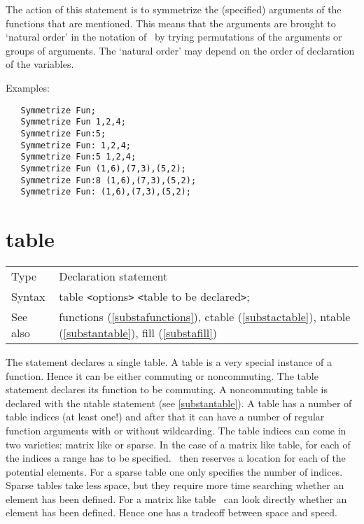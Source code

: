 \noindent The action of this statement is to symmetrize the 
(specified) arguments of the functions that are mentioned. This means that 
the arguments are brought to `natural order' in the notation of \FORM\ by 
trying permutations of the arguments or groups of 
arguments. The `natural order' may depend on the order of declaration of 
the variables. \vspace{4mm}

\noindent Examples:
\begin{verbatim}
   Symmetrize Fun;
   Symmetrize Fun 1,2,4;
   Symmetrize Fun:5;
   Symmetrize Fun: 1,2,4;
   Symmetrize Fun:5 1,2,4;
   Symmetrize Fun (1,6),(7,3),(5,2);
   Symmetrize Fun:8 (1,6),(7,3),(5,2);
   Symmetrize Fun: (1,6),(7,3),(5,2);
\end{verbatim}
 \vspace{10mm}


\section{table}
\label{substatable}

\noindent \begin{tabular}{ll}
Type & Declaration statement\\
Syntax & table {\tt<}options{\tt>} {\tt<}table to be 
declared{\tt>}; \\
See also & functions (\ref{substafunctions}), ctable (\ref{substactable}),
        ntable (\ref{substantable}), fill (\ref{substafill})
\end{tabular}\vspace{4mm}

\noindent The statement declares a single table. A table is a 
very special instance of a function. Hence it can be either 
commuting or noncommuting. The table 
statement declares its function to be commuting. A noncommuting table is 
declared with the ntable statement (see \ref{substantable}). A 
table has a number of table indices (at least one!) 
and after that it can have a number of regular function arguments with or 
without wildcarding. The table indices can come in two varieties: 
matrix like or sparse. In the case of a 
matrix like table, for each of the indices a range 
has to be specified. \FORM\ then reserves a location for each of the 
potential elements. For a sparse table one only 
specifies the number of indices. Sparse tables take less space, but they 
require more time searching whether an element has been defined. For a 
matrix like table \FORM\ can look directly whether an element has been 
defined. Hence one has a tradeoff between space and speed.\vspace{4mm}

